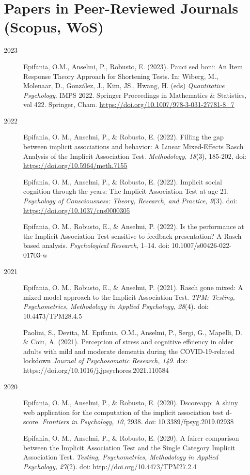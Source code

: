 \documentclass[letterpaper,12pt]{article}
\begin{document}
\section{Papers in Peer-Reviewed Journals (Scopus, WoS)}
\begin{description}
	\item[2023]

\item[] Epifania, O.M., Anselmi, P., Robusto, E. (2023). Pauci sed boni: An Item Response Theory Approach for Shortening Tests. In: Wiberg, M., Molenaar, D., González, J., Kim, JS., Hwang, H. (eds) \emph{Quantitative Psychology}. IMPS 2022. Springer Proceedings in Mathematics \& Statistics, vol 422. Springer, Cham. \url{https://doi.org/10.1007/978-3-031-27781-8_7}

	\item[2022] 
\item[] Epifania, O. M., Anselmi, P., \& Robusto, E. (2022). Filling the gap between implicit associations and behavior: A Linear Mixed-Effects Rasch Analysis of the Implicit Association Test. \emph{Methodology, 18}(3), 185-202, doi: \url{https://doi.org/10.5964/meth.7155}
\item[] Epifania, O. M., Anselmi, P., \& Robusto, E. (2022). Implicit social cognition through the years: The Implicit Association Test at age 21. \emph{Psychology of Consciousness: Theory, Research, and Practice, 9}(3). doi: \url{https://doi.org/10.1037/cns0000305}
\item[] Epifania, O. M., Robusto, E., \& Anselmi, P. (2022). Is the performance at the Implicit Association Test sensitive to feedback presentation? A Rasch-based analysis. \emph{Psychological
Research}, 1–14. doi: 10.1007/s00426-022-01703-w
\item[2021] 
\item[] Epifania, O. M., Robusto, E., \& Anselmi, P. (2021). Rasch gone mixed: A mixed model approach to the Implicit Association Test. \emph{TPM: Testing, Psychometrics, Methodology in Applied Psychology, 28}(4). doi: 10.4473/TPM28.4.5
\item[] Paolini, S., Devita, M. Epifania, O.M., Anselmi, P., Sergi, G., Mapelli, D. \& Coin, A. (2021). Perception of stress and cognitive effciency in older adults with mild and moderate dementia during the COVID-19-related lockdown \emph{Journal of Psychosomatic Research, 149}. doi: https://doi.org/10.1016/j.jpsychores.2021.110584
\item [2020]
\item[] Epifania, O. M., Anselmi, P., \& Robusto, E. (2020). Dscoreapp: A shiny web application for the computation of the implicit association test d-score. \emph{Frontiers in Psychology, 10}, 2938. doi: 10.3389/fpsyg.2019.02938
\item[] Epifania, O. M., Anselmi, P., \& Robusto, E. (2020). A fairer comparison between the Implicit Association Test and the Single Category Implicit Association Test. \emph{Testing, Psychometrics, Methodology in Applied Psychology, 27}(2). doi: http://doi.org/10.4473/TPM27.2.4
\end{description}
\end{document}
